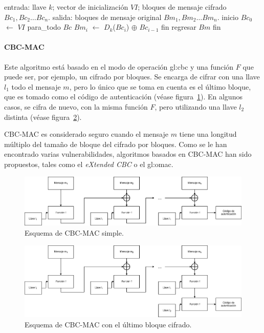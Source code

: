 \begin{pseudocodigo}[%
    caption={\Gls{gl:modo_de_operacion} \gls{gl:cbc}, descifrado.},
    label={cbc:2}%
  ]
    entrada: llave $ k $; vector de inicialización $ VI $;
             bloques de mensaje cifrado $ Bc_1, Bc_2 \dots Bc_n $.
    salida:  bloques de mensaje original $ Bm_1, Bm_2 \dots Bm_n $.
    inicio
      $Bc_0$ $\gets$ $ VI $
      para_todo $Bc$
        $Bm_i$ $\gets$ $D_k$($Bc_i$) $\oplus$ $Bc_{i-1}$
      fin
      regresar $Bm$
    fin
\end{pseudocodigo}

\paragraph{CBC-MAC}
Este algoritmo está basado en el modo de operación \gls{gl:cbc} y una función
$F$ que puede ser, por ejemplo, un cifrado por bloques. Se encarga de
cifrar con una llave $l_1$ todo el mensaje $m$, pero lo único que se toma en
cuenta es el último bloque, que es tomado como el código de autenticación
(véase figura~\ref{mac:cbc1}). En algunos casos, se cifra de nuevo, con la
misma función $F$, pero utilizando una llave $l_2$ distinta (véase
figura~\ref{mac:cbc2}).

CBC-MAC es considerado seguro cuando el mensaje $m$ tiene una longitud
múltiplo del tamaño de bloque del cifrado por bloques. Como se le han
encontrado varias vulnerabilidades, algoritmos basados en CBC-MAC han sido
propuestos, tales como el \textit{eXtended CBC} o el \gls{gl:omac}.

\begin{figure}
  \begin{center}
    \includegraphics[width=0.9\linewidth]{diagramas/cbcmac.png}
    \caption{Esquema de CBC-MAC simple.}
    \label{mac:cbc1}
  \end{center}
\end{figure}

\begin{figure}
  \begin{center}
    \includegraphics[width=0.9\linewidth]{diagramas/cbcmaclb.png}
    \caption{Esquema de CBC-MAC con el último bloque cifrado.}
    \label{mac:cbc2}
  \end{center}
\end{figure}
